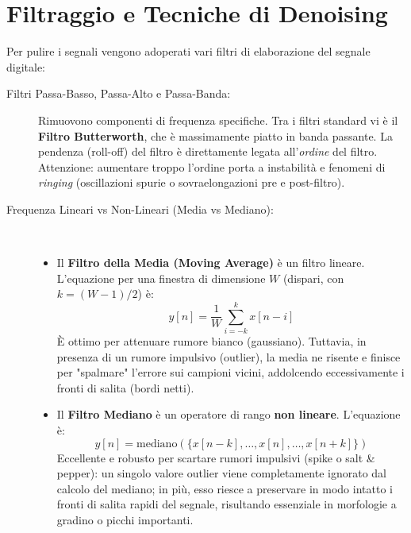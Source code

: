 \section{Filtraggio e Tecniche di Denoising}
Per pulire i segnali vengono adoperati vari filtri di elaborazione del segnale digitale:
\begin{description}
    \item[Filtri Passa-Basso, Passa-Alto e Passa-Banda:] Rimuovono componenti di frequenza specifiche.
    Tra i filtri standard vi è il \textbf{Filtro Butterworth}, che è massimamente piatto in banda passante.
    La pendenza (roll-off) del filtro è direttamente legata all'\emph{ordine} del filtro.
    Attenzione: aumentare troppo l'ordine porta a instabilità e fenomeni di \emph{ringing} (oscillazioni spurie o sovraelongazioni pre e post-filtro).
    \item[Frequenza Lineari vs Non-Lineari (Media vs Mediano):] \mbox{} \\
    \begin{itemize}
        \item Il \textbf{Filtro della Media (Moving Average)} è un filtro lineare. L'equazione per una finestra di dimensione $W$ (dispari, con $k=(W-1)/2$) è:
        \begin{equation}
            y[n] = \frac{1}{W} \sum_{i=-k}^{k} x[n-i]
        \end{equation}
        È ottimo per attenuare rumore bianco (gaussiano).
        Tuttavia, in presenza di un rumore impulsivo (outlier), la media ne risente e finisce per "spalmare" l'errore sui campioni vicini, addolcendo eccessivamente i fronti di salita (bordi netti).

        \item Il \textbf{Filtro Mediano} è un operatore di rango \textbf{non lineare}. L'equazione è:
        \begin{equation}
            y[n] = \text{mediano}( \{ x[n-k], \dots, x[n], \dots, x[n+k] \} )
        \end{equation}
        Eccellente e robusto per scartare rumori impulsivi (spike o salt \& pepper): un singolo valore outlier viene completamente ignorato dal calcolo del mediano; in più, esso riesce a preservare in modo intatto i fronti di salita rapidi del segnale, risultando essenziale in morfologie a gradino o picchi importanti.
    \end{itemize}
\end{description}

